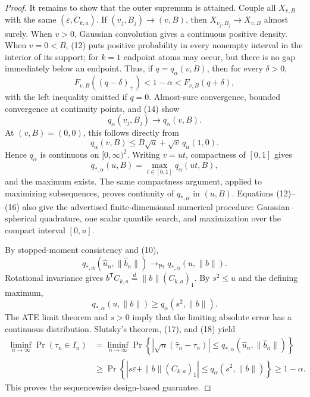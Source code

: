 \documentclass{article}
\begin{document}
\begin{proof}
It remains to show that the outer supremum is attained.  Couple all \(X_{v,B}\) with the same \((\varepsilon,C_{k,a})\).  If \((v_j,B_j)\to(v,B)\), then \(X_{v_j,B_j}\to X_{v,B}\) almost surely.  When \(v>0\), Gaussian convolution gives a continuous positive density.  When \(v=0<B\), (12) puts positive probability in every nonempty interval in the interior of its support; for \(k=1\) endpoint atoms may occur, but there is no gap immediately below an endpoint.  Thus, if \(q=q_\alpha(v,B)\), then for every \(\delta>0\),
\[
 F_{v,B}((q-\delta)_+)<1-\alpha<F_{v,B}(q+\delta), \tag{14}
\]
with the left inequality omitted if \(q=0\).  Almost-sure convergence, bounded convergence at continuity points, and (14) show
\[
 q_\alpha(v_j,B_j)\longrightarrow q_\alpha(v,B). \tag{15}
\]
At \((v,B)=(0,0)\), this follows directly from
\[
 q_\alpha(v,B)\le B\sqrt a+\sqrt v\,q_\alpha(1,0).
\]
Hence \(q_\alpha\) is continuous on \([0,\infty)^2\).  Writing \(v=ut\), compactness of \([0,1]\) gives
\[
 q_{*,\alpha}(u,B)=\max_{t\in[0,1]}q_\alpha(ut,B), \tag{16}
\]
and the maximum exists.  The same compactness argument, applied to maximizing subsequences, proves continuity of \(q_{*,\alpha}\) in \((u,B)\).  Equations (12)--(16) also give the advertised finite-dimensional numerical procedure: Gaussian--spherical quadrature, one scalar quantile search, and maximization over the compact interval \([0,u]\).

By stopped-moment consistency and (10),
\[
 q_{*,\alpha}(\widehat u_n,\|\widehat b_n\|)
 \longrightarrow_{\Pr}q_{*,\alpha}(u,\|b\|). \tag{17}
\]
Rotational invariance gives
\(b^{\mathsf T}C_{k,a}\overset d=\|b\|(C_{k,a})_1\).  By \(s^2\le u\) and the defining maximum,
\[
 q_{*,\alpha}(u,\|b\|)\ge q_\alpha(s^2,\|b\|). \tag{18}
\]
The ATE limit theorem and \(s>0\) imply that the limiting absolute error has a continuous distribution.  Slutsky's theorem, (17), and (18) yield
\[
 \begin{aligned}
 \liminf_{n\to\infty}\Pr(\tau_n\in I_n)
 &=\liminf_{n\to\infty}\Pr\!\left\{
 |\sqrt n(\widehat\tau_n-\tau_n)|
 \le q_{*,\alpha}(\widehat u_n,\|\widehat b_n\|)\right\}\\
 &\ge \Pr\!\left\{|s\varepsilon+\|b\|(C_{k,a})_1|
 \le q_\alpha(s^2,\|b\|)\right\}\ge1-\alpha. \tag{19}
 \end{aligned}
\]
This proves the sequencewise design-based guarantee.


\end{proof}
\end{document}
